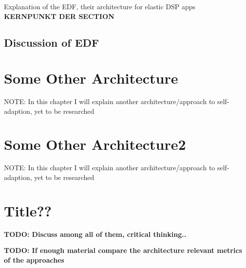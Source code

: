         Explanation of the EDF, their architecture for elastic DSP apps \textbf{KERNPUNKT DER SECTION}

        \subsection{Discussion of EDF}
        \label{sec:discussion-edf}

    \section{Some Other Architecture}
    \label{sec:soa}
    NOTE: In this chapter I will explain another architecture/approach to self-adaption, yet to be researched


    \section{Some Other Architecture2}
    \label{sec:soa2}
    NOTE: In this chapter I will explain another architecture/approach to self-adaption, yet to be researched


    \section{Title??}
    \textbf{TODO: Discuss among all of them, critical thinking..}

    \textbf{TODO: If enough material compare the architecture relevant metrics of the approaches}